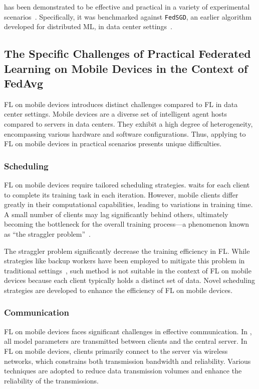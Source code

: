 \documentclass[conference]{IEEEtran}
\begin{document}
\FedAvg{} has been demonstrated to be effective and practical
in a variety of experimental scenarios~\cite{mcmahan2017communication}.
Specifically, it was benchmarked against \verb|FedSGD|\cite{chen2016revisiting},
an earlier algorithm developed for distributed ML,
in data center settings~\cite{bonawitz2019towards}.

\subsection{The Specific Challenges of Practical Federated Learning on
Mobile Devices in the Context of FedAvg}

FL on mobile devices introduces distinct challenges compared to
FL in data center settings.
Mobile devices are a diverse set of intelligent agent hosts compared to
servers in data centers.
They exhibit a high degree of heterogeneity,
encompassing various hardware and software configurations.
Thus, applying \FedAvg{} to FL on mobile devices in practical scenarios
presents unique difficulties.

\subsubsection{Scheduling}

FL on mobile devices require tailored scheduling strategies.
\FedAvg{} waits for each client to complete its training task in
each iteration.
However, mobile clients differ greatly in their computational capabilities,
leading to variations in training time.
A small number of clients may lag significantly behind others,
ultimately becoming the bottleneck for the overall training process—a
phenomenon known as
``the straggler problem''~\cite{chen2020asynchronous,zheng2017asynchronous}.

The straggler problem significantly decrease the training efficiency in FL.
While strategies like backup workers have been employed to
mitigate this problem in traditional settings~\cite{chen2016revisiting},
such method is not suitable in the context of FL on mobile devices because
each client typically holds a distinct set of data.
Novel scheduling strategies are developed to
enhance the efficiency of FL on mobile devices.

\subsubsection{Communication}

FL on mobile devices faces significant challenges in effective communication.
In \FedAvg{}, all model parameters are transmitted between
clients and the central server.
In FL on mobile devices,
clients primarily connect to the server via wireless networks,
which constrains both transmission bandwidth and reliability.
Various techniques are adopted to reduce data transmission volumes
and enhance the reliability of the transmissions.
\end{document}
